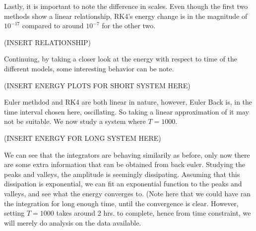 Lastly, it is important to note the difference in scales. Even though the first two methods show a linear relationship, RK4's energy change is in the magnitude of $10^{-17}$ compared to around $10^{-7}$ for the other two. 

(INSERT RELATIONSHIP)

Continuing, by taking a closer look at the energy with respect to time of the different models, some interesting behavior can be note. 

(INSERT ENERGY PLOTS FOR SHORT SYSTEM HERE)

Euler methdod and RK4 are both linear in nature, however, Euler Back is, in the time interval chosen here, oscillating. So taking a linear approximation of it may not be suitable. We now study a system where $T = 1000$. 

(INSERT ENERGY FOR LONG SYSTEM HERE)

We can see that the integrators are behaving similarily as before, only now there are some extra information that can be obtained from back euler. Studying the peaks and valleys, the amplitude is seemingly dissipating. Assuming that this dissipation is exponential, we can fit an exponential function to the peaks and valleys, and see what the energy converges to. (Note here that we could have ran the integration for long enough time, until the convergence is clear. However, setting $T=1000$ takes around 2 hrs. to complete, hence from time constraint, we will merely do analysis on the data available. 





